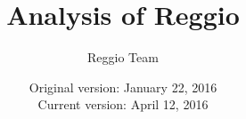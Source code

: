 \documentclass[12pt]{article}
\begin{document}
\title{Analysis of Reggio}
\author{Reggio Team}
\date{Original version: January 22, 2016 \\ Current version: April 12, 2016} %
\maketitle 

\doublespacing





%


\pagebreak



\appendix
%

\end{document}

